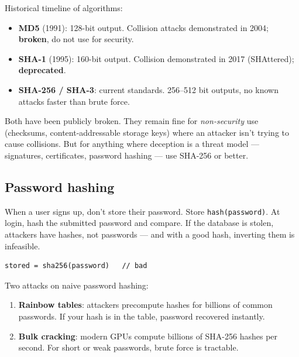 \documentclass[11pt]{article}
\begin{document}
Historical timeline of algorithms:
\begin{itemize}[leftmargin=*]
    \item \textbf{MD5} (1991): 128-bit output. Collision attacks
          demonstrated in 2004; \textbf{broken}, do not use for
          security.
    \item \textbf{SHA-1} (1995): 160-bit output. Collision
          demonstrated in 2017 (SHAttered); \textbf{deprecated}.
    \item \textbf{SHA-256 / SHA-3}: current standards.
          256--512 bit outputs, no known attacks faster than
          brute force.
\end{itemize}

\begin{warnbox}
Both have been publicly broken. They remain fine for
\emph{non-security} use (checksums, content-addressable storage
keys) where an attacker isn't trying to cause collisions. But
for anything where deception is a threat model --- signatures,
certificates, password hashing --- use SHA-256 or better.
\end{warnbox}

\subsection*{Password hashing}

When a user signs up, don't store their password. Store
\texttt{hash(password)}. At login, hash the submitted password
and compare. If the database is stolen, attackers have hashes,
not passwords --- and with a good hash, inverting them is
infeasible.

\begin{examplebox}
\begin{lstlisting}[basicstyle=\ttfamily\small,frame=single]
stored = sha256(password)   // bad
\end{lstlisting}
\end{examplebox}

Two attacks on naive password hashing:

\begin{enumerate}[leftmargin=*]
    \item \textbf{Rainbow tables}: attackers precompute hashes
          for billions of common passwords. If your hash is in
          the table, password recovered instantly.
    \item \textbf{Bulk cracking}: modern GPUs compute billions of
          SHA-256 hashes per second. For short or weak passwords,
          brute force is tractable.
\end{enumerate}
\end{document}
